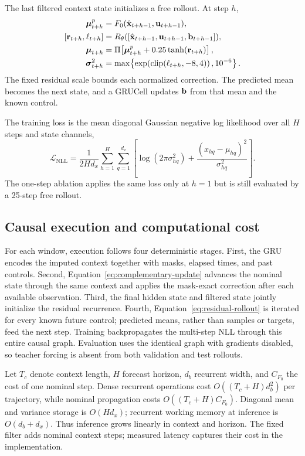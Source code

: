 The last filtered context state initializes a free rollout. At step $h$,
\begin{align}
 \boldsymbol\mu^{p}_{t+h} &= F_0(\hat{\vect x}_{t+h-1},\vect u_{t+h-1}),\\
 [\vect r_{t+h},\vect \ell_{t+h}] &=
 R_\theta([\hat{\vect x}_{t+h-1},\vect u_{t+h-1},\vect b_{t+h-1}]),\\
 \boldsymbol\mu_{t+h} &= \Pi\!\left[
 \boldsymbol\mu^{p}_{t+h}+0.25\tanh(\vect r_{t+h})\right],\\
 \boldsymbol\sigma^2_{t+h} &=
 \max\!\left\{\exp\!\left(\operatorname{clip}(\vect\ell_{t+h},-8,4)\right),
 10^{-6}\right\}.
 \label{eq:residual-rollout}
\end{align}
The fixed residual scale bounds each normalized correction. The predicted mean
becomes the next state, and a GRUCell updates $\mathbf{b}$ from that mean and the
known control.

The training loss is the mean diagonal Gaussian negative log likelihood over
all $H$ steps and state channels,
\begin{equation}
 \mathcal L_{\mathrm{NLL}}=
 \frac{1}{2Hd_x}\sum_{h=1}^{H}\sum_{q=1}^{d_x}
 \left[\log(2\pi\sigma^2_{hq})+
 \frac{(x_{hq}-\mu_{hq})^2}{\sigma^2_{hq}}\right].
 \label{eq:nll}
\end{equation}
The one-step ablation applies the same loss only at $h=1$ but is still
evaluated by a 25-step free rollout.

\subsection{Causal execution and computational cost}

For each window, execution follows four deterministic stages. First, the GRU
encodes the imputed context together with masks, elapsed times, and past
controls. Second, Equation~\eqref{eq:complementary-update} advances the nominal
state through the same context and applies the mask-exact correction after each
available observation. Third, the final hidden state and filtered state jointly
initialize the residual recurrence. Fourth, Equation~\eqref{eq:residual-rollout}
is iterated for every known future control; predicted means, rather than samples
or targets, feed the next step. Training backpropagates the multi-step NLL
through this entire causal graph. Evaluation uses the identical graph with
gradients disabled, so teacher forcing is absent from both validation and test
rollouts.

Let $T_c$ denote context length, $H$ forecast horizon, $d_b$ recurrent width,
and $C_{F_0}$ the cost of one nominal step. Dense recurrent operations cost
$O((T_c+H)d_b^2)$ per trajectory, while nominal propagation costs
$O((T_c+H)C_{F_0})$. Diagonal mean and variance storage is $O(Hd_x)$; recurrent
working memory at inference is $O(d_b+d_x)$. Thus inference grows linearly in
context and horizon. The fixed filter adds nominal context steps; measured
latency captures their cost in the implementation.

